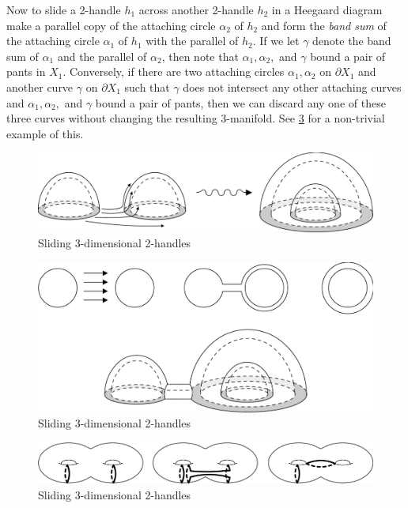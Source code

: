 Now to slide a 2-handle $h_1$ across another 2-handle $h_2$ in a Heegaard diagram make a parallel copy of the attaching circle $\alpha_2$ of $h_2$ and form the \emph{band sum} of the attaching circle $\alpha_1$ of $h_1$ with the parallel of $h_2$. If we let $\gamma$ denote the band sum of $\alpha_1$ and the parallel of $\alpha_2$, then note that $\alpha_1,\alpha_2,$ and $\gamma$ bound a pair of pants in $X_1$. Conversely, if there are two attaching circles $\alpha_1,\alpha_2$ on $\partial X_1$ and another curve $\gamma$ on $\partial X_1$ such that $\gamma$ does not intersect any other attaching curves and $\alpha_1,\alpha_2,$ and $\gamma$ bound a pair of pants, then we can discard any one of these three curves without changing the resulting 3-manifold. See \cref{sliding-3dim-2handles-3} for a non-trivial example of this.


\begin{figure}[tb]
\centering
\includegraphics[scale=.6]{graphics/sliding-3dim-2handles}
\caption{Sliding 3-dimensional 2-handles}
\label{sliding-3dim-2handles}
\end{figure}

\begin{figure}[tb]
\centering
\includegraphics[scale=.6]{graphics/sliding-3dim-2handles-2}
\caption{Sliding 3-dimensional 2-handles}
\label{sliding-3dim-2handles-2}
\end{figure}

\begin{figure}[tb]
\centering
\includegraphics[scale=.6]{graphics/sliding-3dim-2handles-3}
\caption{Sliding 3-dimensional 2-handles}
\label{sliding-3dim-2handles-3}
\end{figure}


